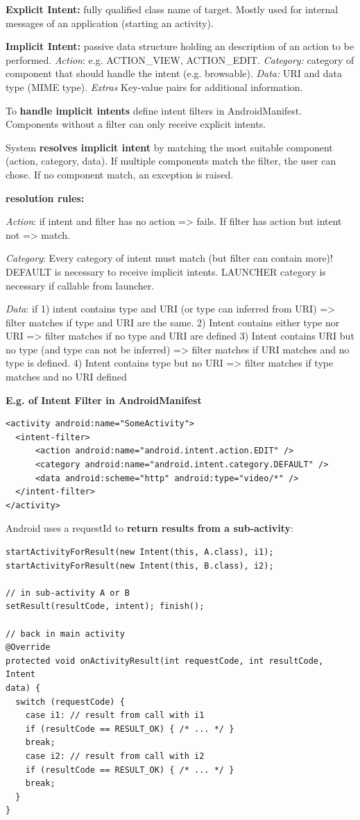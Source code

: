 \textbf{Explicit Intent:} fully qualified class name of target. Mostly used for
internal messages of an application (starting an activity).

\textbf{Implicit Intent:} passive data structure holding an description of an
action to be performed. \textit{Action}: e.g. ACTION\_VIEW, ACTION\_EDIT.
\textit{Category:} category of component that should handle the intent (e.g.
browsable). \textit{Data:} URI and data type (MIME type). \textit{Extras}
Key-value pairs for additional information.

To \textbf{handle implicit intents} define intent filters in AndroidManifest.
Components without a filter can only receive explicit intents.

System \textbf{resolves implicit intent} by matching the most suitable
component (action, category, data). If multiple components match the filter,
the user can chose. If no component match, an exception is raised.

\textbf{resolution rules:}

\textit{Action}: if intent and filter has no action => fails. If filter has
action but intent not => match.

\textit{Category}: Every category of intent must match (but filter can contain
more)! DEFAULT is necessary to receive implicit intents. LAUNCHER category is
necessary if callable from launcher.

\textit{Data}: if 1) intent contains type and URI (or type can inferred from
URI) => filter matches if type and URI are the same.
2) Intent contains either type nor URI => filter matches if no type and URI are
defined
3) Intent contains URI but no type (and type can not be inferred) => filter
matches if URI matches and no type is defined.
4) Intent contains type but no URI => filter matches if type matches and no URI defined


\textbf{E.g. of Intent Filter in AndroidManifest}
\begin{lstlisting}
<activity android:name="SomeActivity">
  <intent-filter>
      <action android:name="android.intent.action.EDIT" />
      <category android:name="android.intent.category.DEFAULT" />
      <data android:scheme="http" android:type="video/*" />
  </intent-filter>
</activity>
\end{lstlisting}

Android uses a requestId to \textbf{return results from a sub-activity}:
\begin{lstlisting}
startActivityForResult(new Intent(this, A.class), i1);
startActivityForResult(new Intent(this, B.class), i2);

// in sub-activity A or B
setResult(resultCode, intent); finish();

// back in main activity
@Override
protected void onActivityResult(int requestCode, int resultCode, Intent
data) {
  switch (requestCode) {
    case i1: // result from call with i1
    if (resultCode == RESULT_OK) { /* ... */ }
    break;
    case i2: // result from call with i2
    if (resultCode == RESULT_OK) { /* ... */ }
    break;
  }
}
\end{lstlisting}



